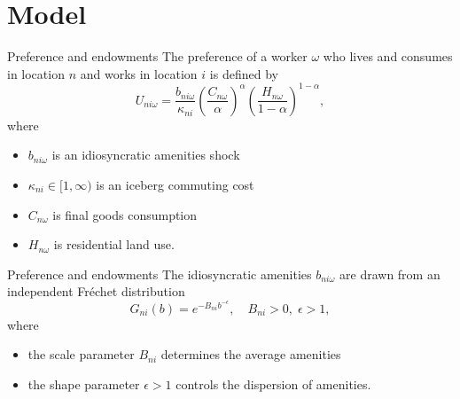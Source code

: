 \documentclass{beamer}
\begin{document}
\section{Model}
\begin{frame}[shrink]
	\transfade %
	\tableofcontents[sectionstyle=show/shaded,subsectionstyle=show/shaded/hide]
	\addtocounter{framenumber}{-1}
\end{frame}
\begin{frame}{Preference and endowments}
	The preference of a worker $\omega$ who lives and consumes in location $n$ and works in location $i$ is defined by
	\begin{equation}
		U_{ni\omega} = \frac{b_{ni\omega}}{\kappa_{ni}}\left(\frac{C_{n\omega}}{\alpha}\right)^\alpha \left(\frac{H_{n\omega}}{1-\alpha}\right)^{1-\alpha},
	\end{equation}
	where
	\begin{itemize}
		\item $b_{ni\omega}$ is an idiosyncratic amenities shock
		\item $\kappa_{ni}\in [1,\infty)$ is an iceberg commuting cost
		\item $C_{n\omega}$ is final goods consumption
		\item $H_{n\omega}$ is residential land use.
	\end{itemize}
\end{frame}
\begin{frame}{Preference and endowments}
	The idiosyncratic amenities $b_{ni\omega}$ are drawn from an independent Fr\'echet distribution
	\begin{equation}
		G_{ni}(b) = e^{-B_{ni}b^{-\epsilon}}, \quad B_{ni}>0,\; \epsilon > 1,
	\end{equation}
	where
	\begin{itemize}
		\item the scale parameter $B_{ni}$ determines the average amenities
		\item the shape parameter $\epsilon>1$  controls the dispersion of amenities.
	\end{itemize}
\end{frame}
\end{document}
